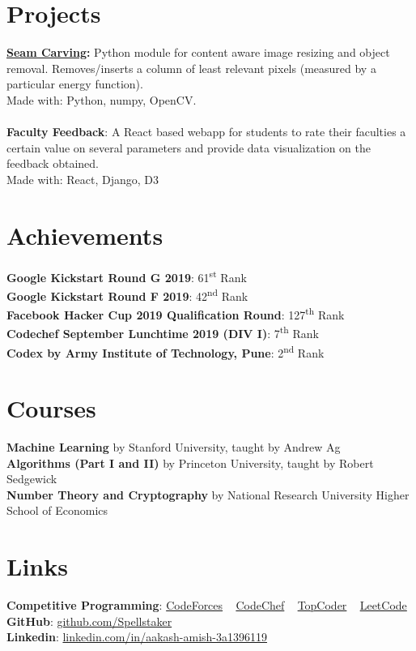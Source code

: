 \documentclass[margin, centered]{res}
\begin{document}
\begin{resume}
		\section{Projects}
			\textbf{\href{https://github.com/Spellstaker/Seam-Carving}{Seam Carving}:}
			Python module for content aware image resizing and object removal.
			Removes/inserts a column of least relevant pixels (measured by a particular energy function).\\
			Made with: Python, numpy, OpenCV.
			\\ \\
			\textbf{Faculty Feedback}:
			A React based webapp for students to rate their faculties a certain value on several parameters
			and provide data visualization on the feedback obtained.\\
			Made with: React, Django, D3
		
		\section{Achievements}
			\textbf{Google Kickstart Round G 2019}: 61\textsuperscript{st} Rank\\
			\textbf{Google Kickstart Round F 2019}: 42\textsuperscript{nd} Rank\\
			\textbf{Facebook Hacker Cup 2019 Qualification Round}: 127\textsuperscript{th} Rank\\
			\textbf{Codechef  September Lunchtime 2019 (DIV I)}: 7\textsuperscript{th} Rank\\
			\textbf{Codex by Army Institute of Technology, Pune}: 2\textsuperscript{nd} Rank
		
		\section{Courses}
			\textbf{Machine Learning} by Stanford University, taught by Andrew Ag\\
			\textbf{Algorithms (Part I and II)} by Princeton University, taught by Robert Sedgewick\\
			\textbf{Number Theory and Cryptography} by National Research University Higher School of Economics 
		
		\section{Links}
			\textbf{Competitive Programming}:
			\href{https://codeforces.com/profile/spellstaker}{CodeForces}
			~
			\href{https://www.codechef.com/users/spellstaker}{CodeChef}
			~
			\href{https://topcoder.com/members/spellstaker/}{TopCoder}
			~
			\href{https://leetcode.com/spellstaker/}{LeetCode}
			\\
			\textbf{GitHub}: \href{https://github.com/Spellstaker}{github.com/Spellstaker}
			\\
			\textbf{Linkedin}: \href{https://www.linkedin.com/in/aakash-amish-3a1396119/}{linkedin.com/in/aakash-amish-3a1396119}
	\end{resume}
\end{document}
